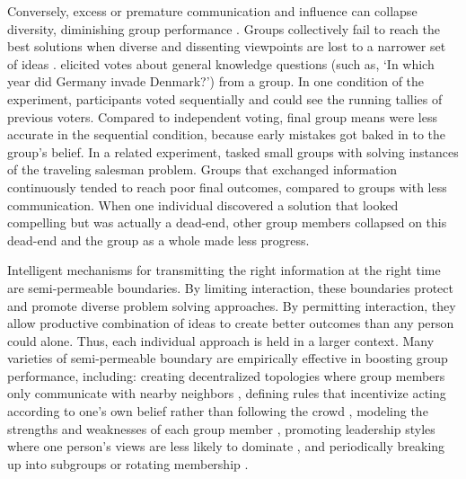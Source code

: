 \documentclass[11pt]{article}
\begin{document}
Conversely, excess or premature communication and influence can collapse diversity, diminishing group performance \citep{surowiecki2005wisdom, hogarth1978note, ladha1992condorcet, hong2004groups}. Groups collectively fail to reach the best solutions when diverse and dissenting viewpoints are lost to a narrower set of ideas \citep{anderson1997information, stasser1985pooling, flowers1977laboratory, becker2017network, janis1972victims, bernstein2018intermittent, diehl1987productivity, frey2021social}. \cite{frey2021social} elicited votes about general knowledge questions (such as, `In which year did Germany invade Denmark?') from a group. In one condition of the experiment, participants voted sequentially and could see the running tallies of previous voters. Compared to independent voting, final group means were less accurate in the sequential condition, because early mistakes got baked in to the group's belief. In a related experiment, \cite{bernstein2018intermittent} tasked small groups with solving instances of the traveling salesman problem. Groups that exchanged information continuously tended to reach poor final outcomes, compared to groups with less communication. When one individual discovered a solution that looked compelling but was actually a dead-end, other group members collapsed on this dead-end and the group as a whole made less progress. 

Intelligent mechanisms for transmitting the right information at the right time are semi-permeable boundaries. By limiting interaction, these boundaries protect and promote diverse problem solving approaches. By permitting interaction, they allow productive combination of ideas to create better outcomes than any person could alone. Thus, each individual approach is held in a larger context. Many varieties of semi-permeable boundary are empirically effective in boosting group performance, including: creating decentralized topologies where group members only communicate with nearby neighbors \citep{becker2017network, mason2008propagation}, defining rules that incentivize acting according to one's own belief rather than following the crowd \citep{hung2001information, bazazi2019self}, modeling the strengths and weaknesses of each group member \citep{welinder2010multidimensional}, promoting leadership styles where one person's views are less likely to dominate \citep{flowers1977laboratory, leana1985partial}, and periodically breaking up into subgroups or rotating membership \citep{hauer2021science, trainer2020team, straus2011group, feldman1994whos, kane2005knowledge, wu2022membership, vafeas2003length, bebchuk2005costs, baron2005so}. 
\end{document}
